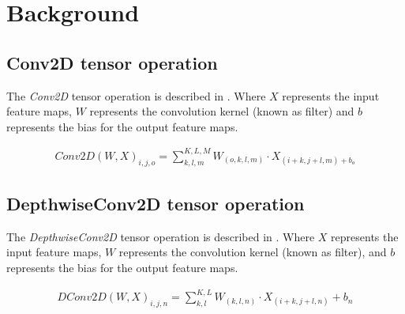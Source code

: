 \section{Background}
\label{sec:background}
\subsection{Conv2D tensor operation}
The \emph{Conv2D} tensor operation is described in . Where $X$ represents the input feature maps, $W$ represents the convolution kernel (known as filter) and $b$ represents the bias for the output feature maps\cite{goodfellow2016deep}.

\begin{eqnarray} \label{eq:conv2D}
Conv2D\left(W,X\right)_{i,j,o}=\sum_{k,l,m}^{K,L,M}W_{(o,k,l,m)} \cdot X_{(i+k,j+l,m)+b_{o}}
\end{eqnarray} 	
 	
\subsection{DepthwiseConv2D tensor operation}
The \emph{DepthwiseConv2D} tensor operation is described in . Where $X$ represents the input feature maps, $W$ represents the convolution kernel (known as filter), and $b$ represents the bias for the output feature maps.

\begin{eqnarray} \label{eq:dconv2D}
DConv2D\left(W,X\right)_{i,j,n}=\sum_{k,l}^{K,L}W_{(k,l,n)} \cdot X_{(i+k,j+l,n)}+b_{n}
\end{eqnarray}